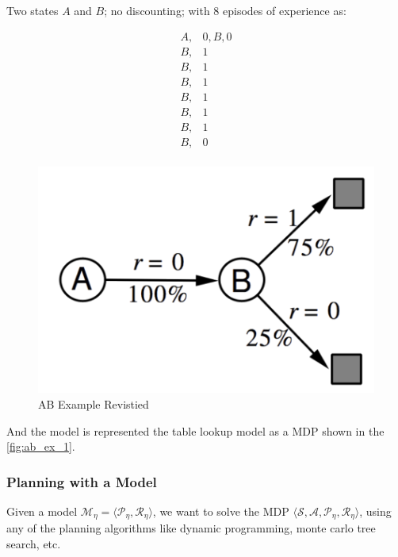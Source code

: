 \begin{example}[AB Example]
    Two states \(A\) and \(B\); no discounting; with 8 episodes of experience as:
    \begin{figure}[H]
        \begin{minipage}{0.5\textwidth}
          \[
            \begin{aligned}
                A, & 0, B, 0 \\
                B, & 1\\ 
                B, & 1\\        
                B, & 1\\        
                B, & 1\\        
                B, & 1\\        
                B, & 1\\        
                B, & 0\\        
            \end{aligned}
          \]
        \end{minipage}%
        \begin{minipage}{0.5\textwidth}
          \includegraphics[width=\textwidth]{figures/ab-ex.png}
          \caption{AB Example Revistied}
            \label{fig:ab_ex_1}
        \end{minipage}
      \end{figure}
      And the model is represented the table lookup model as a MDP shown in the \autoref{fig:ab_ex_1}.
\end{example}

\subsubsection{Planning with a Model}
Given a model \(\mathcal{M} _\eta = \langle \mathcal{P}_\eta, \mathcal{R}_\eta \rangle\), we want to solve the 
MDP \(\langle \mathcal{S}, \mathcal{A}, \mathcal{P}_\eta, \mathcal{R}_\eta \rangle\), using any of the 
planning algorithms like dynamic programming, monte carlo tree search, etc.

